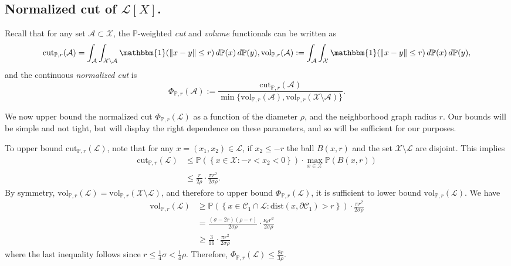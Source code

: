 \documentclass[11pt,twoside]{article}
\newcommand{\set}[1]{\left\{#1\right\}}
\newcommand{\vol}{\mathrm{vol}}
\newcommand{\cut}{\mathrm{cut}}
\newcommand{\norm}[1]{\left\lVert#1\right\rVert}
\newcommand{\1}{\mathbbm{1}}
\newcommand{\dist}{\mathrm{dist}}
\newcommand{\Xbf}{X}
\newcommand{\Pbb}{\mathbb{P}}
\newcommand{\Cset}{\mathcal{C}}
\newcommand{\Aset}{\mathcal{A}}
\begin{document}
\subsection{Normalized cut of $\mathcal{L}[\Xbf]$.}

Recall that for any set $\mathcal{A} \subset \mathcal{X}$, the $\Pbb$-weighted \emph{cut} and \emph{volume} functionals can be written as
\begin{equation*}
\cut_{\Pbb,r}(\Aset) = \int_{\Aset} \int_{\mathcal{X} \setminus \Aset} \1(\norm{x - y} \leq r) \,d\Pbb(x) \,d\Pbb(y), \vol_{\Pbb,r}(\Aset):= \int_{\Aset} \int_{\mathcal{X}} \1(\norm{x - y} \leq r) \,d\Pbb(x) \,d\Pbb(y),
\end{equation*}
and the continuous \emph{normalized cut} is
\begin{equation*}
\Phi_{\Pbb,r}(\Aset) := \frac{\cut_{\Pbb,r}(\Aset)}{\min\{\vol_{\Pbb,r}(\Aset),\vol_{\Pbb,r}(\mathcal{X} \setminus \Aset)\}}.
\end{equation*}

We now upper bound the normalized cut $\Phi_{\Pbb,r}(\mathcal{L})$ as a function of the diameter $\rho$, and the neighborhood graph radius $r$. Our bounds will be simple and not tight, but will display the right dependence on these parameters, and so will be sufficient for our purposes.

To upper bound $\cut_{\Pbb,r}(\mathcal{L})$, note that for any $x = (x_1,x_2) \in \mathcal{L}$, if $x_2 \leq -r$ the ball $B(x,r)$ and the set $\mathcal{X}\setminus\mathcal{L}$ are disjoint. This implies
\begin{align*}
\cut_{\Pbb,r}(\mathcal{L}) & \leq \Pbb(\set{x \in \mathcal{X}: -r < x_2 < 0}) \cdot \max_{x \in \mathcal{X}} \Pbb(B(x,r)) \\
& \leq \frac{r}{2 \rho} \cdot \frac{\pi r^2}{2 \sigma \rho}.
\end{align*}
By symmetry, $\vol_{\Pbb,r}(\mathcal{L}) = \vol_{\Pbb,r}(\mathcal{X} \setminus \mathcal{L})$, and therefore to upper bound $\Phi_{\Pbb,r}(\mathcal{L})$, it is sufficient to lower bound $\vol_{\Pbb,r}(\mathcal{L})$. We have
\begin{align*}
\vol_{\Pbb,r}(\mathcal{L}) & \geq \Pbb(\set{x \in \Cset_1 \cap \mathcal{L}: \dist(x, \partial \Cset_1) > r}) \cdot \frac{\pi r^2}{2 \sigma \rho} \\
& = \frac{(\sigma - 2r)(\rho - r)}{2 \sigma \rho} \cdot \frac{\nu_d r^d}{2 \sigma \rho}  \\
& \geq \frac{3}{16} \cdot \frac{\pi r^2}{2 \sigma \rho}
\end{align*}
where the last inequality follows since $r \leq \frac{1}{4}\sigma < \frac{1}{4}\rho$. Therefore, $\Phi_{\Pbb,r}(\mathcal{L}) \leq \frac{8r}{3\rho}.$
\end{document}
